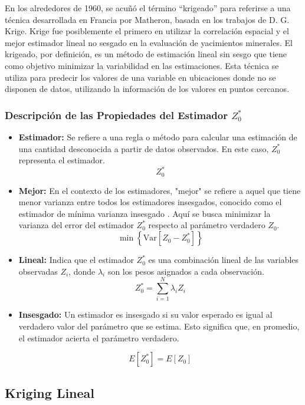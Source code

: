En los alrededores de 1960, se acuñó el término ``krigeado'' para referirse a una técnica desarrollada en Francia por Matheron, basada en los trabajos de D. G. Krige. Krige fue posiblemente el primero en utilizar la correlación espacial y el mejor estimador lineal no sesgado en la evaluación de yacimientos minerales. El krigeado, por definición, es un método de estimación lineal sin sesgo que tiene como objetivo minimizar la variabilidad en las estimaciones. Esta técnica se utiliza para predecir los valores de una variable en ubicaciones donde no se disponen de datos, utilizando la información de los valores en puntos cercanos.


\subsubsection*{Descripción de las Propiedades del Estimador \( Z_0^* \)}

\begin{itemize}
  \item \textbf{Estimador:} Se refiere a una regla o método para calcular una estimación de una cantidad desconocida a partir de datos observados. En este caso, \( Z_0^* \) representa el estimador.
  \[
  Z_0^*
  \]

  \item \textbf{Mejor:} En el contexto de los estimadores, "mejor" se refiere a aquel que tiene menor varianza entre todos los estimadores insesgados, conocido como el estimador de mínima varianza insesgado . Aquí se busca minimizar la varianza del error del estimador \( Z_0^* \) respecto al parámetro verdadero \( Z_0 \).
  \[
  \min \left\{ \text{Var} \left[ Z_0 - Z_0^* \right] \right\}
  \]

  \item \textbf{Lineal:} Indica que el estimador \( Z_0^* \) es una combinación lineal de las variables observadas \( Z_i \), donde \( \lambda_i \) son los pesos asignados a cada observación.
  \[
  Z_0^* = \sum_{i=1}^{N} \lambda_i Z_i
  \]

  \item \textbf{Insesgado:} Un estimador es insesgado si su valor esperado es igual al verdadero valor del parámetro que se estima. Esto significa que, en promedio, el estimador acierta el parámetro verdadero.
  
  \[
  E\left[Z_0^*\right] = E\left[Z_0\right]
  \]
  
\end{itemize}


\subsection{Kriging Lineal}

